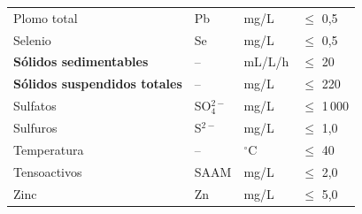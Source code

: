 \documentclass[12pt,a4paper]{article}
\begin{document}
\begin{longtable}{p{4.5cm}p{2.0cm}p{2.0cm}p{3.5cm}}
Plomo total & Pb & mg/L & $\leq$ 0,5 \\
Selenio & Se & mg/L & $\leq$ 0,5 \\
\textbf{S\'olidos sedimentables} & -- & mL/L/h & $\leq$ 20 \\
\textbf{S\'olidos suspendidos totales} & -- & mg/L & $\leq$ 220 \\
Sulfatos & SO$_4^{2-}$ & mg/L & $\leq$ 1\,000 \\
Sulfuros & S$^{2-}$ & mg/L & $\leq$ 1,0 \\
Temperatura & -- & $^\circ$C & $\leq$ 40 \\
Tensoactivos & SAAM & mg/L & $\leq$ 2,0 \\
Zinc & Zn & mg/L & $\leq$ 5,0 \\
\end{longtable}

\newpage


\end{document}
